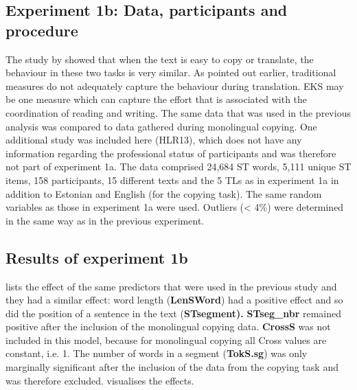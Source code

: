 \documentclass[output=paper]{LSP/langsci}
\begin{document}
\subsection{Experiment 1b: Data, participants and procedure}

The study by \citet{Carl2012Inside} showed that when the text is easy to copy or translate, the behaviour in these two tasks is very similar. As pointed out earlier, traditional  measures do not adequately capture the behaviour during translation. EKS may be one measure which can capture the effort that is associated with the coordination of reading and writing. The same data that was used in the previous analysis was compared to data gathered during monolingual copying. One additional study was included here (HLR13), which does not have any information regarding the professional status of participants and was therefore not part of experiment 1a. The data comprised 24,684 ST words, 5,111 unique ST items, 158 participants, 15 different texts and the 5 TLs as in experiment 1a in addition to Estonian and English (for the copying task). The same random variables as those in experiment 1a were used. Outliers ({\textless} 4\%) were determined in the same way as in the previous experiment.

\subsection{Results of experiment 1b}
 lists the effect of the same predictors that were used in the previous study and they had a similar effect: word length (\textbf{LenSWord}) had a positive effect and so did the position of a sentence in the text (\textbf{STsegment).} \textbf{STseg\_nbr} remained positive after the inclusion of the monolingual copying data. \textbf{CrossS }was not included in this model, because for monolingual copying all Cross values are constant, i.e. 1. The number of words in a segment (\textbf{TokS.sg}) was only marginally significant after the inclusion of the data from the copying task and was therefore excluded.  visualises the effects.
\end{document}
